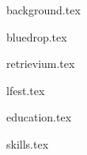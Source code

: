 \documentclass[11pt]{article}
\begin{document}
{background.tex}


{bluedrop.tex}

{retrievium.tex}

{lfest.tex}


{education.tex}


{skills.tex}
\end{document}
